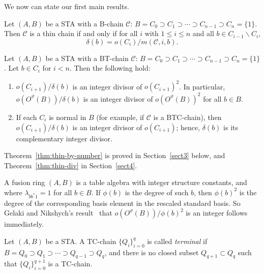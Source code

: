 We now can state our first main results.

\begin{thm}
\label{thm:thin-by-number}
Let $(A, B)$ be a STA with a B-chain $\mathcal{C}$: $B = C_0 \supset C_1
\supset \cdots \supset C_{n-1} \supset C_n = \{1\}$. Then $\mathcal{C}$
is a thin chain if and only if for all $i$ with $1 \leq i \leq n$ and
all $b \in C_{i-1}\backslash C_i$,
\[
\delta(b) = o(C_i)/m(\mathcal{C}, i, b).
\]
\end{thm}

\begin{thm}
\label{thm:thin-div}
Let $(A, B)$ be a STA with a BT-chain $\mathcal{C}$: $B = C_0 \supset
C_1 \supset \cdots \supset C_{n-1} \supset C_n = \{1\}$. Let $b \in
C_i$ for $i < n$. Then the following hold:
\begin{enumerate}[label = (\roman*)] 
\item $o(C_{i+1})/\delta(b)$ is an integer divisor of
$o(C_{i+1})^2$. In particular,
$o(O^{\vartheta}(B))/\delta(b)$ is an integer divisor of
$o(O^{\vartheta}(B))^2$ for all $b \in B$. 
\item If each $C_i$ is normal in $B$ (for example, if $\mathcal{C}$ is a
BTC-chain), then $o(C_{i+1})/\delta(b)$ is an integer divisor of
$o(C_{i+1})$; hence, $\delta(b)$ is its complementary integer divisor.
\end{enumerate}
\end{thm} 

Theorem~\ref{thm:thin-by-number} is proved in Section~\ref{sect3}  below, and
Theorem~\ref{thm:thin-div} in Section~\ref{sect4}. 

\begin{rema}
\label{rem:fus}
A fusion ring $(A, B)$ is a table algebra with integer structure
constants, and where $\lambda_{bb^*1} = 1$ for all $b \in B$. If
$\phi(b)$ is the degree of such $b$, then $\phi(b)^2$ is the degree of
the corresponding basis element in the rescaled standard basis. So
Gelaki and Nikshych's result~\cite [Corollary~5.3]{GN} that
$o(O^{\vartheta}(B))/\phi(b)^2$ is an integer follows immediately.
\end{rema}

\begin{defi}
\label{def:terminal}
Let $(A, B)$ be a STA. A TC-chain $\{Q_i\}_{i=0}^q$ is called
\emph{terminal} if $B = Q_0 \supset Q_1 \supset \cdots \supset Q_{q-1}
\supset Q_q$, and there is no closed subset $Q_{q+1} \subset Q_q$ such
that $\{Q_i\}_{i=0}^{q+1}$ is a TC-chain.
\end{defi}

